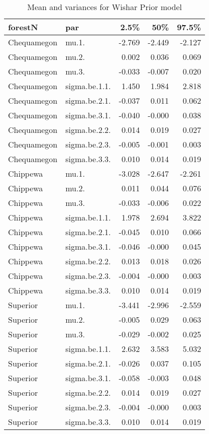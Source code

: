 \begin{table}[ht]
\begin{center}
\begin{tabular}{llrrr}
  \hline
forestN & par & 2.5\% & 50\% & 97.5\% \\ 
  \hline
Chequamegon & mu.1. & -2.769 & -2.449 & -2.127 \\ 
  Chequamegon & mu.2. & 0.002 & 0.036 & 0.069 \\ 
  Chequamegon & mu.3. & -0.033 & -0.007 & 0.020 \\ 
  Chequamegon & sigma.be.1.1. & 1.450 & 1.984 & 2.818 \\ 
  Chequamegon & sigma.be.2.1. & -0.037 & 0.011 & 0.062 \\ 
  Chequamegon & sigma.be.3.1. & -0.040 & -0.000 & 0.038 \\ 
  Chequamegon & sigma.be.2.2. & 0.014 & 0.019 & 0.027 \\ 
  Chequamegon & sigma.be.2.3. & -0.005 & -0.001 & 0.003 \\ 
  Chequamegon & sigma.be.3.3. & 0.010 & 0.014 & 0.019 \\ 
  Chippewa & mu.1. & -3.028 & -2.647 & -2.261 \\ 
  Chippewa & mu.2. & 0.011 & 0.044 & 0.076 \\ 
  Chippewa & mu.3. & -0.033 & -0.006 & 0.022 \\ 
  Chippewa & sigma.be.1.1. & 1.978 & 2.694 & 3.822 \\ 
  Chippewa & sigma.be.2.1. & -0.045 & 0.010 & 0.066 \\ 
  Chippewa & sigma.be.3.1. & -0.046 & -0.000 & 0.045 \\ 
  Chippewa & sigma.be.2.2. & 0.013 & 0.018 & 0.026 \\ 
  Chippewa & sigma.be.2.3. & -0.004 & -0.000 & 0.003 \\ 
  Chippewa & sigma.be.3.3. & 0.010 & 0.014 & 0.019 \\ 
  Superior & mu.1. & -3.441 & -2.996 & -2.559 \\ 
  Superior & mu.2. & -0.005 & 0.029 & 0.063 \\ 
  Superior & mu.3. & -0.029 & -0.002 & 0.025 \\ 
  Superior & sigma.be.1.1. & 2.632 & 3.583 & 5.032 \\ 
  Superior & sigma.be.2.1. & -0.026 & 0.037 & 0.105 \\ 
  Superior & sigma.be.3.1. & -0.058 & -0.003 & 0.048 \\ 
  Superior & sigma.be.2.2. & 0.014 & 0.019 & 0.027 \\ 
  Superior & sigma.be.2.3. & -0.004 & -0.000 & 0.003 \\ 
  Superior & sigma.be.3.3. & 0.010 & 0.014 & 0.019 \\ 
   \hline
\end{tabular}
\caption{Mean and variances for Wishar Prior model}
\end{center}
\end{table}
